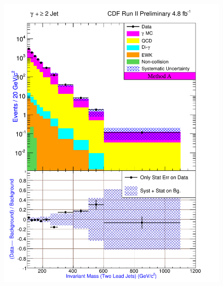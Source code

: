 \begin{figure}[h!]
{\includegraphics[keepaspectratio=true, scale=\resultsHistScale]{G30Jets_MtdA_plot2_InvMass_j1j2.pdf}}

\end{figure}
